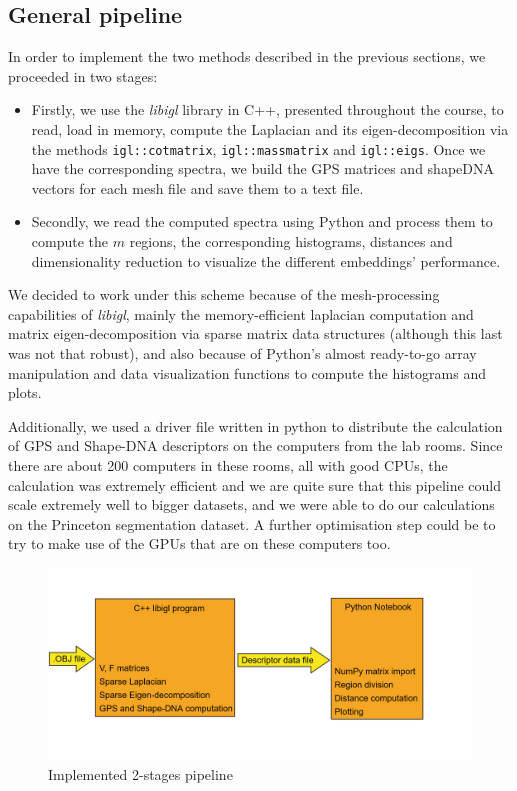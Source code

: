 \documentclass[conference]{IEEEtran}
\begin{document}
\subsection{General pipeline}

In order to implement the two methods described in the previous sections, we proceeded in two stages:
\begin{itemize}
    \item Firstly, we use the \emph{libigl} library \cite{Libigl} in C++, presented throughout the course, to read, load in memory, compute the Laplacian and its eigen-decomposition via the methods \texttt{igl::cotmatrix}, \texttt{igl::massmatrix} and \texttt{igl::eigs}. Once we have the corresponding spectra, we build the GPS matrices and shapeDNA vectors for each mesh file and save them to a text file.
    \item Secondly, we read the computed spectra using Python and process them to compute the $m$ regions, the corresponding histograms, distances and dimensionality reduction to visualize the different embeddings' performance.
\end{itemize}

We decided to work under this scheme because of the mesh-processing capabilities of \emph{libigl}, mainly the memory-efficient laplacian computation and matrix eigen-decomposition via sparse matrix data structures (although this last was not that robust), and also because of Python's almost ready-to-go array manipulation and data visualization functions to compute the histograms and plots.

Additionally, we used a driver file written in python to distribute the calculation of GPS and Shape-DNA descriptors on the computers from the lab rooms. Since there are about 200 computers in these rooms, all with good CPUs, the calculation was extremely efficient and we are quite sure that this pipeline could scale extremely well to bigger datasets, and we were able to do our calculations on the Princeton segmentation dataset. A further optimisation step could be to try to make use of the GPUs that are on these computers too.

\begin{figure}[H]
    \centering
    \includegraphics[width=\columnwidth]{pipeline_diagram.png}
    \caption{Implemented 2-stages pipeline}
    \label{fig:pipeline}
\end{figure}
\end{document}
